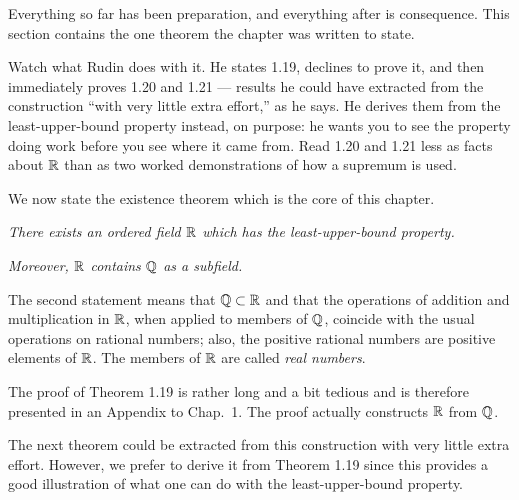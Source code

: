 
\begin{signpost}
Everything so far has been preparation, and everything after is consequence.
This section contains the one theorem the chapter was written to state.

\smallskip
Watch what Rudin does with it. He states 1.19, declines to prove it, and then
immediately proves 1.20 and 1.21 --- results he could have extracted from the
construction ``with very little extra effort,'' as he says. He derives them from
the least-upper-bound property instead, on purpose: he wants you to see the
property doing work before you see where it came from. Read 1.20 and 1.21 less
as facts about $\mathbb{R}$ than as two worked demonstrations of how a supremum is
used.
\end{signpost}

\noindent
We now state the existence theorem which is the core of this chapter.

\emph{There exists an ordered field $\mathbb{R}$ which has the least-upper-bound
property.}

\emph{Moreover, $\mathbb{R}$ contains $\mathbb{Q}$ as a subfield.}

The second statement means that $\mathbb{Q} \subset \mathbb{R}$ and that the operations of
addition and multiplication in $\mathbb{R}$, when applied to members of $\mathbb{Q}$, coincide
with the usual operations on rational numbers; also, the positive rational
numbers are positive elements of $\mathbb{R}$. The members of $\mathbb{R}$ are called \emph{real
numbers}.

The proof of Theorem 1.19 is rather long and a bit tedious and is therefore
presented in an Appendix to Chap.\ 1. The proof actually constructs $\mathbb{R}$ from
$\mathbb{Q}$.

The next theorem could be extracted from this construction with very little
extra effort. However, we prefer to derive it from Theorem 1.19 since this
provides a good illustration of what one can do with the least-upper-bound
property.

